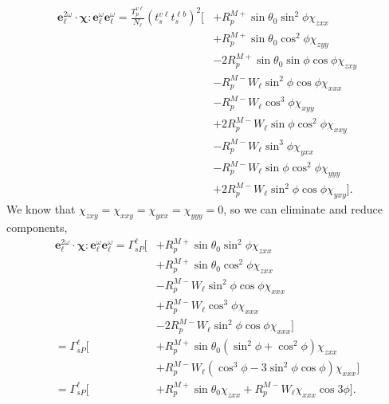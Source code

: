 \documentclass{article}
\begin{document}
\begin{equation*}
\begin{split}
\mathbf{e}^{2\omega}_{\ell}\cdot\boldsymbol{\chi}:
\mathbf{e}^{\omega}_{\ell}\mathbf{e}^{\omega}_{\ell} =
\frac{T^{v\ell}_{p}}{N_{\ell}}
\left(t^{v\ell}_{s}t^{\ell b}_{s}\right)^{2}
\big[
&+ R^{M+}_{p}\sin\theta_{0}\sin^{2}\phi
   \chi_{zxx}\\
&+ R^{M+}_{p}\sin\theta_{0}\cos^{2}\phi
   \chi_{zyy}\\
&- 2R^{M+}_{p}\sin\theta_{0}\sin\phi\cos\phi
   \chi_{zxy}\\
&- R^{M-}_{p}W_{\ell}\sin^{2}\phi\cos\phi
   \chi_{xxx}\\
&- R^{M-}_{p}W_{\ell}\cos^{3}\phi
   \chi_{xyy}\\
&+ 2R^{M-}_{p}W_{\ell}\sin\phi\cos^{2}\phi
   \chi_{xxy}\\
&- R^{M-}_{p}W_{\ell}\sin^{3}\phi
   \chi_{yxx}\\
&- R^{M-}_{p}W_{\ell}\sin\phi\cos^{2}\phi
   \chi_{yyy}\\
&+ 2R^{M-}_{p}W_{\ell}\sin^{2}\phi\cos\phi
   \chi_{yxy}
\big].
\end{split}
\end{equation*}
We know that $\chi_{zxy}=\chi_{xxy}=\chi_{yxx}=\chi_{yyy}=0$, so we can
eliminate and reduce components,
\begin{equation*}
\begin{split}
\mathbf{e}^{2\omega}_{\ell}\cdot\boldsymbol{\chi}:
\mathbf{e}^{\omega}_{\ell}\mathbf{e}^{\omega}_{\ell} =
\Gamma^{\ell}_{sP}
\big[
&+ R^{M+}_{p}\sin\theta_{0}\sin^{2}\phi\chi_{zxx}\\
&+ R^{M+}_{p}\sin\theta_{0}\cos^{2}\phi\chi_{zxx}\\
&- R^{M-}_{p}W_{\ell}\sin^{2}\phi\cos\phi\chi_{xxx}\\
&+ R^{M-}_{p}W_{\ell}\cos^{3}\phi\chi_{xxx}\\
&- 2R^{M-}_{p}W_{\ell}\sin^{2}\phi\cos\phi\chi_{xxx}
\big]\\
= \Gamma^{\ell}_{sP}
\big[
&+ R^{M+}_{p}\sin\theta_{0}(\sin^{2}\phi + \cos^{2}\phi)\chi_{zxx}\\
&+ R^{M-}_{p}W_{\ell}(\cos^{3}\phi - 3\sin^{2}\phi\cos\phi)\chi_{xxx}
\big]\\
= \Gamma^{\ell}_{sP}
\big[
&+ R^{M+}_{p}\sin\theta_{0}\chi_{zxx} + R^{M-}_{p}W_{\ell}\chi_{xxx}\cos3\phi
\big].
\end{split}
\end{equation*}
\end{document}
